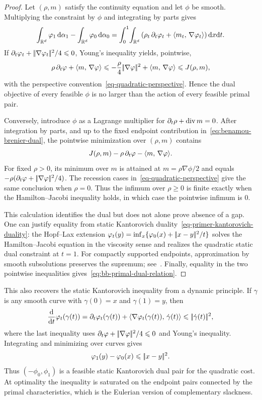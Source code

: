 \begin{proof}
	Let $(\rho,m)$ satisfy the continuity equation and let $\phi$ be smooth. Multiplying the constraint by $\phi$ and integrating by parts gives
	\[
		\int_{\mathbb{R}^d}\varphi_1\,\mathrm{d}\alpha_1
		-
		\int_{\mathbb{R}^d}\varphi_0\,\mathrm{d}\alpha_0
		=
		\int_0^1\!\int_{\mathbb{R}^d}
		\left(\rho_t\,\partial_t\varphi_t+\langle m_t,\,\nabla\varphi_t\rangle\right)\mathrm{d} x\mathrm{d} t.
	\]
	If $\partial_t\varphi_t+|\!| \nabla\varphi_t |\!|^2/4\leqslant0$, Young's inequality yields, pointwise,
	\[
		\rho\,\partial_t\varphi+\langle m,\,\nabla\varphi\rangle
		\leqslant
		-\frac{\rho}{4}|\!| \nabla\varphi |\!|^2+\langle m,\,\nabla\varphi\rangle
		\leqslant
		J(\rho,m),
	\]
	with the perspective convention~\eqref{eq-quadratic-perspective}. Hence the dual objective of every feasible $\phi$ is no larger than the action of every feasible primal pair.

	Conversely, introduce $\phi$ as a Lagrange multiplier for $\partial_t\rho+\operatorname{div} m=0$. After integration by parts, and up to the fixed endpoint contribution in~\eqref{eq:benamou-brenier-dual}, the pointwise minimization over $(\rho,m)$ contains
	\[
		J(\rho,m)-\rho\,\partial_t\varphi-\langle m,\,\nabla\varphi\rangle.
	\]
	For fixed $\rho>0$, its minimum over $m$ is attained at $m=\rho\nabla\phi/2$ and equals $-\rho(\partial_t\varphi+|\!| \nabla\varphi |\!|^2/4)$. The recession cases in~\eqref{eq-quadratic-perspective} give the same conclusion when \(\rho=0\). Thus the infimum over $\rho\geq0$ is finite exactly when the Hamilton--Jacobi inequality holds, in which case the pointwise infimum is $0$.

	This calculation identifies the dual but does not alone prove absence of a gap. One can justify equality from static Kantorovich duality~\eqref{eq-primer-kantorovich-duality}: the Hopf--Lax extension $\varphi_t(y)=\inf_x\{\varphi_0(x)+|\!| x-y |\!|^2/t\}$ solves the Hamilton--Jacobi equation in the viscosity sense and realizes the quadratic static dual constraint at $t=1$. For compactly supported endpoints, approximation by smooth subsolutions preserves the supremum; see~\citet{Villani03,SantambrogioBook}. Finally, equality in the two pointwise inequalities gives~\eqref{eq:bb-primal-dual-relation}.
\end{proof}

This also recovers the static Kantorovich inequality from a dynamic principle. If $\gamma$ is any smooth curve with $\gamma(0)=x$ and $\gamma(1)=y$, then
\[
	\frac{\mathrm{d}}{\mathrm{d} t}\varphi_t(\gamma(t))
	=
	\partial_t\varphi_t(\gamma(t))+\langle \nabla\varphi_t(\gamma(t)),\,\dot\gamma(t)\rangle
	\leqslant
	|\!| \dot\gamma(t) |\!|^2,
\]
where the last inequality uses $\partial_t\varphi+|\!| \nabla\varphi |\!|^2/4\leqslant0$ and Young's inequality. Integrating and minimizing over curves gives
\[
	\varphi_1(y)-\varphi_0(x)\leqslant|\!| x-y |\!|^2.
\]
Thus $(-\phi_0,\phi_1)$ is a feasible static Kantorovich dual pair for the quadratic cost. At optimality the inequality is saturated on the endpoint pairs connected by the primal characteristics, which is the Eulerian version of complementary slackness.

